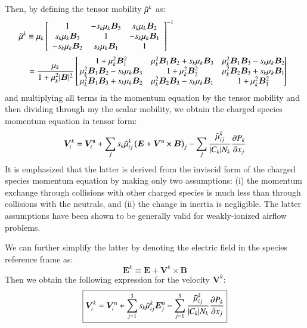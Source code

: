 \documentclass{warpdoc}
\newcommand{\alb}{\vspace{0.2cm}\\} %
\newcommand{\mfd}{\displaystyle}
\newcommand\frameeqn[1]{\fbox{$\displaystyle #1$}}
\newcommand{\nd}{3}
\renewcommand{\vec}[1]{\bm{#1}}
\begin{document}
%
Then, by defining the tensor mobility $\tilde{\mu}^k$ as:
%
\begin{equation}
\!\!\!
\begin{array}{l}\mfd
\wtilde{\mu}^k  \equiv \mu_k \left[\begin{array}{ccc} 
      1 & -s_k \mu_k \vec{B}_3  &  s_k \mu_k \vec{B}_2 \\
      s_k \mu_k \vec{B}_3 &  1 &  -s_k \mu_k \vec{B}_1 \\
      -s_k \mu_k \vec{B}_2 &  s_k \mu_k \vec{B}_1 & 1  \\
    \end{array} \right]^{-1}\alb\mfd~~
~~~=\frac{\mu_k}{1+\mu_k^2|\vec{B}|^2}\left[\!\!\begin{array}{ccc} 
      1+\mu_k^2 \vec{B}_1^2 & \mu_k^2\vec{B}_1\vec{B}_2+s_k \mu_k \vec{B}_3  & \mu_k^2\vec{B}_1\vec{B}_3-s_k \mu_k \vec{B}_2   \\
      \mu_k^2\vec{B}_1\vec{B}_2-s_k\mu_k\vec{B}_3 &  1+\mu_k^2\vec{B}_2^2 &  \mu_k^2\vec{B}_2\vec{B}_3+s_k\mu_k\vec{B}_1 \\
      \mu_k^2\vec{B}_1\vec{B}_3 +s_k\mu_k\vec{B}_2 & \mu_k^2 \vec{B}_2\vec{B}_3-s_k\mu_k\vec{B}_1  & 1+\mu_k^2\vec{B}_3^2  \\
    \end{array} \!\!\!\!\right]
\end{array}
\label{eqn:mutilde}
\end{equation}
%
and multiplying all terms in the momentum equation by the tensor mobility and then dividing through my the scalar mobility, we obtain the charged species momentum equation in tensor form:
%
\begin{equation}
  \vec{V}^{k}_i = \vec{V}^{\rm n}_i+\sum_j s_k \wtilde{\mu}^k_{ij}  \left(\vec{E}  + \vec{V}^{\rm n} \times \vec{B}\right)_j
             - \sum_j  \frac{\wtilde{\mu}^k_{ij}}{|C_k| N_k} \frac{\partial P_k}{\partial x_j}
\end{equation}
%
It is emphasized that the latter is derived from the inviscid form of the charged species momentum equation by making only two assumptions: (i) the momentum exchange through collisions with other charged species is much less than through collisions with the neutrals, and (ii) the change in inertia is negligible. The latter assumptions have been shown to be generally valid for weakly-ionized airflow problems.

We can further simplify the latter by denoting the electric field in the species reference frame as:
%
\begin{equation}
\vec{E}^k \equiv \vec{E}+\vec{V}^k \times \vec{B}
\end{equation}
%
Then we obtain the following expression for the velocity $\vec{V}^k$: 
%
\begin{equation}
\frameeqn{
  \vec{V}^{k}_i = \vec{V}^{\rm n}_i+\sum_{j=1}^\nd s_k \wtilde{\mu}^k_{ij}  \vec{E}_j^{\rm n}
             - \sum_{j=1}^\nd  \frac{\wtilde{\mu}^{k}_{ij}}{|C_k| N_k} \frac{\partial P_k}{\partial x_j}
}
  \label{eqn:V}
\end{equation}
%
\end{document}
